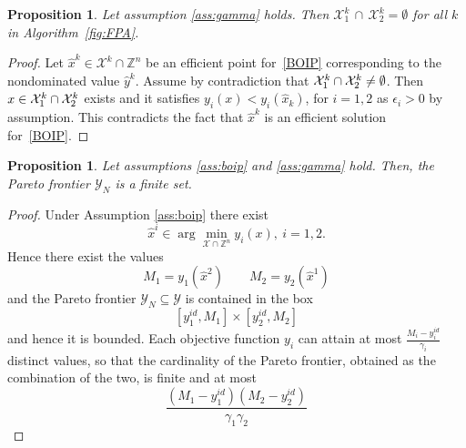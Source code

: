 \documentclass[preprint,12pt]{elsarticle}
\newtheorem{proposition}[theorem]{Proposition}
\def\X{{\cal X}}
\def\Z{\mathbb{Z}}
\begin{document}
\begin{proposition}\label{prop:part}
Let assumption \ref{ass:gamma} holds.
 Then $\mathcal{X}^k_1\,\cap \,\mathcal{X}^k_2 = \emptyset$ for all $k$ in Algorithm~\ref{fig:FPA}.
\end{proposition}
\begin{proof}
 Let $\hat x^k\in \mathcal{X}^k\cap \Z^n$ be an efficient point for~\eqref{BOIP} corresponding to the nondominated value $\hat y^k$. Assume by contradiction that $ \X^{k}_1 \cap \X^{k}_2 \neq \emptyset$.
 Then $x \in \X^{k}_1 \cap \X^{k}_2$ exists and it satisfies $y_i(x) <y_i(\hat{x}_k)$, for $i=1,2$ as $\epsilon_i>0$ by assumption. This contradicts the fact that
 $\hat x^k$ is an efficient solution for~\eqref{BOIP}.
\end{proof}



\begin{proposition}\label{prop:Yfinite}
Let assumptions \ref{ass:boip} and \ref{ass:gamma} hold.
Then, the Pareto frontier $\mathcal{Y}_N$ is a finite set.
\end{proposition}
\begin{proof}
Under Assumption \ref{ass:boip} there exist
$$\hat x^{i}\in \arg\min_{\mathcal{X}\cap \Z^n} y_i(x),\  i=1,2.$$
Hence there exist the values
$$M_1= y_1(\hat x^{2})\qquad M_2= y_2(\hat x^{1})$$
and
the Pareto frontier $\mathcal{Y}_N\subseteq \mathcal{Y}$ is contained in the box
$$[y_1^{id}, M_1]\times [y_2^{id}, M_2]$$
and hence it is bounded.
Each objective function $y_i$ can attain at most $\frac{M_i - y_i^{id}}{\gamma_i}$ distinct values, so that the cardinality of the Pareto frontier,
obtained as the combination of the two, is finite and at most
\[\frac{(M_1 - y_1^{id})(M_2 - y_2^{id})}{\gamma_1 \gamma_2}\]
\end{proof}
\end{document}
